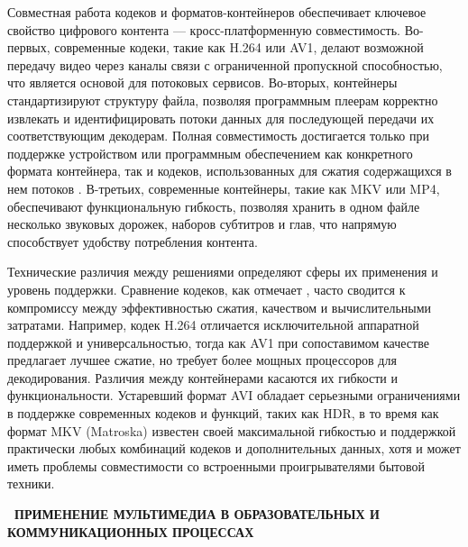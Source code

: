 \documentclass{SibFU-docs}
\begin{document}
Совместная работа кодеков и форматов-контейнеров обеспечивает ключевое свойство цифрового контента — кросс-платформенную совместимость. Во-первых, современные кодеки, такие как H.264 или AV1, делают возможной передачу видео через каналы связи с ограниченной пропускной способностью, что является основой для потоковых сервисов. Во-вторых, контейнеры стандартизируют структуру файла, позволяя программным плеерам корректно извлекать и идентифицировать потоки данных для последующей передачи их соответствующим декодерам. Полная совместимость достигается только при поддержке устройством или программным обеспечением как конкретного формата контейнера, так и кодеков, использованных для сжатия содержащихся в нем потоков \cite{richardson_video_codec_design}. В-третьих, современные контейнеры, такие как MKV или MP4, обеспечивают функциональную гибкость, позволяя хранить в одном файле несколько звуковых дорожек, наборов субтитров и глав, что напрямую способствует удобству потребления контента.


Технические различия между решениями определяют сферы их применения и уровень поддержки. Сравнение кодеков, как отмечает \cite{richardson_overview_h264}, часто сводится к компромиссу между эффективностью сжатия, качеством и вычислительными затратами. Например, кодек H.264 отличается исключительной аппаратной поддержкой и универсальностью, тогда как AV1 при сопоставимом качестве предлагает лучшее сжатие, но требует более мощных процессоров для декодирования. Различия между контейнерами касаются их гибкости и функциональности. Устаревший формат AVI обладает серьезными ограничениями в поддержке современных кодеков и функций, таких как HDR, в то время как формат MKV (Matroska) известен своей максимальной гибкостью и поддержкой практически любых комбинаций кодеков и дополнительных данных, хотя и может иметь проблемы совместимости со встроенными проигрывателями бытовой техники.

\newpage
{}
\begin{center}\textbf{\thesection\ ПРИМЕНЕНИЕ МУЛЬТИМЕДИА В ОБРАЗОВАТЕЛЬНЫХ И КОММУНИКАЦИОННЫХ ПРОЦЕССАХ}\end{center}
\vspace*{-1.5em}

\end{document}
